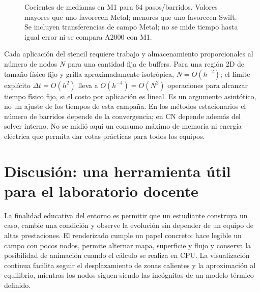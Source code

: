\documentclass[11pt,a4paper]{article}
\newcommand{\dt}{\Delta t}
\begin{document}
\begin{figure}[tbp]\centering{}
\caption{Cocientes de medianas en M1 para 64 pasos/barridos. Valores mayores que uno favorecen Metal; menores que uno favorecen Swift. Se incluyen transferencias de campo Metal; no se mide tiempo hasta igual error ni se compara A2000 con M1.}\label{fig:cost}\end{figure}

Cada aplicación del stencil requiere trabajo y almacenamiento proporcionales al número de nodos $N$ para una cantidad fija de buffers. Para una región 2D de tamaño físico fijo y grilla aproximadamente isotrópica, $N=O(h^{-2})$; el límite explícito $\dt=O(h^2)$ lleva a $O(h^{-4})=O(N^2)$ operaciones para alcanzar tiempo físico fijo, si el costo por aplicación es lineal. Es un argumento asintótico, no un ajuste de los tiempos de esta campaña. En los métodos estacionarios el número de barridos depende de la convergencia; en CN depende además del solver interno. No se midió aquí un consumo máximo de memoria ni energía eléctrica que permita dar cotas prácticas para todos los equipos.

\section{Discusión: una herramienta útil para el laboratorio docente}
La finalidad educativa del entorno es permitir que un estudiante construya un caso, cambie una condición y observe la evolución sin depender de un equipo de altas prestaciones. El renderizado cumple un papel concreto: hace legible un campo con pocos nodos, permite alternar mapa, superficie y flujo y conserva la posibilidad de animación cuando el cálculo se realiza en CPU. La visualización continua facilita seguir el desplazamiento de zonas calientes y la aproximación al equilibrio, mientras los nodos siguen siendo las incógnitas de un modelo térmico definido.
\end{document}

